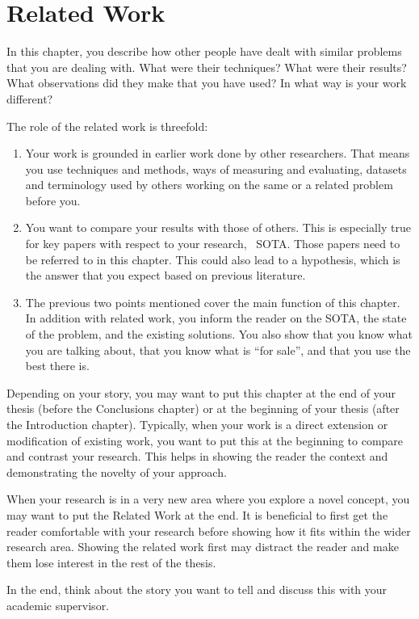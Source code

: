 \chapter{Related Work}\label{ch:related}

In this chapter, you describe how other people have dealt with similar problems that you are dealing with.
What were their techniques?
What were their results?
What observations did they make that you have used?
In what way is your work different?

The role of the related work is threefold:
\begin{enumerate}
\item Your work is grounded in earlier work done by other researchers.
That means you use techniques and methods, ways of measuring and evaluating, datasets and terminology used by others working on the same or a related problem before you.
\item You want to compare your results with those of others.
This is especially true for key papers with respect to your research, \ie{}~\ac{SOTA}.
Those papers need to be referred to in this chapter.
This could also lead to a hypothesis, which is the answer that you expect based on previous literature.
\item The previous two points mentioned cover the main function of this chapter.
In addition with related work, you inform the reader on the \ac{SOTA}, the state of the problem, and the
existing solutions.
You also show that you know what you are talking about, that you know what is ``for sale'', and that you use the best there is.
\end{enumerate}

Depending on your story, you may want to put this chapter at the end of your thesis (before the Conclusions chapter) or at the beginning of your thesis (after the Introduction chapter).
Typically, when your work is a direct extension or modification of existing work, you want to put this at the beginning to compare and contrast your research.
This helps in showing the reader the context and demonstrating the novelty of your approach.

When your research is in a very new area where you explore a novel concept, you may want to put the Related Work at the end.
It is beneficial to first get the reader comfortable with your research before showing how it fits within the wider research area.
Showing the related work first may distract the reader and make them lose interest in the rest of the thesis.

In the end, think about the story you want to tell and discuss this with your academic supervisor.